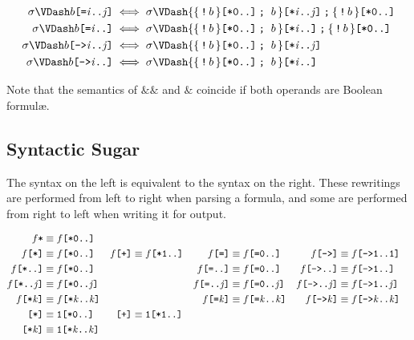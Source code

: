 \documentclass[a4paper,twoside,10pt,DIV=12,draft]{scrreprt}
\DeclareMathOperator{\NOT}{\texttt{!}}
\newcommand{\AND}{\mathbin{\texttt{\&}}}
\newcommand{\ANDALT}{\mathbin{\texttt{\&\&}}}
\newcommand{\CONCAT}{\mathbin{\texttt{;}}}
\newcommand{\0}{\texttt{0}}
\newcommand{\1}{\texttt{1}}
\newcommand{\STAR}[1]{\texttt{[*#1]}}
\newcommand{\STARALT}{\texttt{*}}
\newcommand{\EQUAL}[1]{\texttt{[=#1]}}
\newcommand{\GOTO}[1]{\texttt{[->#1]}}
\newcommand{\PLUS}{\texttt{[+]}}
\newcommand\mvar[1]{\ensuremath{\mathit{#1}}}
\begin{document}
\begin{align*}
  \sigma\VDash b\EQUAL{\mvar{i}..\mvar{j}} & \iff
  \sigma\VDash\mathtt{\{\{}\NOT b\,\mathtt\}\STAR{0..}\CONCAT\ b\,\mathtt\}\STAR{\mvar{i}..\mvar{j}}\CONCAT\mathtt\{\NOT b\,\mathtt\}\STAR{0..}\\
  \sigma\VDash b\EQUAL{\mvar{i}..} & \iff
  \sigma\VDash\mathtt{\{\{}\NOT b\,\mathtt\}\STAR{0..}\CONCAT\ b\,\mathtt\}\STAR{\mvar{i}..}\CONCAT\mathtt\{\NOT b\,\mathtt\}\STAR{0..}\\
  \sigma\VDash b\GOTO{\mvar{i}..\mvar{j}} & \iff
  \sigma\VDash\mathtt{\{\{}\NOT b\,\mathtt\}\STAR{0..}\CONCAT\ b\,\mathtt\}\STAR{\mvar{i}..\mvar{j}}\\
  \sigma\VDash b\GOTO{\mvar{i}..} & \iff
  \sigma\VDash\mathtt{\{\{}\NOT b\,\mathtt\}\STAR{0..}\CONCAT\ b\,\mathtt\}\STAR{\mvar{i}..}\\
\end{align*}

Note that the semantics of $\ANDALT$ and $\AND$ coincide if both
operands are Boolean formul\ae.

\subsection{Syntactic Sugar}

The syntax on the left is equivalent to the syntax on the right.
These rewritings are performed from left to right when parsing a
formula, and some are performed from right to left when writing it for
output.

\begin{align*}
  f\STARALT &\equiv f\STAR{0..}\\
  f\STAR{}    &\equiv f\STAR{0..}  &
  f\PLUS{}    &\equiv f\STAR{1..}  &
  f\EQUAL{}   &\equiv f\EQUAL{0..} &
  f\GOTO{}   &\equiv f\GOTO{1..1} \\
  f\STAR{..}  &\equiv f\STAR{0..}  &
  &&
  f\EQUAL{..}  &\equiv f\EQUAL{0..} &
  f\GOTO{..}  &\equiv f\GOTO{1..} \\
  f\STAR{..\mvar{j}} &\equiv f\STAR{0..\mvar{j}} &
  &&
  f\EQUAL{..\mvar{j}} &\equiv f\EQUAL{0..\mvar{j}} &
  f\GOTO{..\mvar{j}} &\equiv f\GOTO{1..\mvar{j}} \\
  f\STAR{\mvar{k}}  &\equiv f\STAR{\mvar{k}..\mvar{k}}  &
  &&
  f\EQUAL{\mvar{k}}   &\equiv f\EQUAL{\mvar{k}..\mvar{k}} &
  f\GOTO{\mvar{k}}   &\equiv f\GOTO{\mvar{k}..\mvar{k}} \\
  \STAR{}    &\equiv \1\STAR{0..}  &
  \PLUS{}    &\equiv \1\STAR{1..}  \\
  \STAR{\mvar{k}}    &\equiv \1\STAR{\mvar{k}..\mvar{k}}  &
\end{align*}
\end{document}

